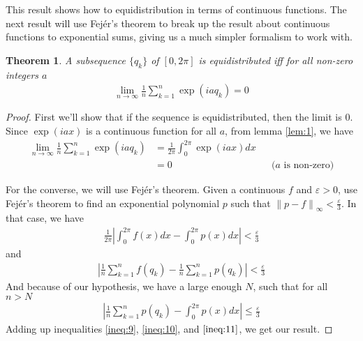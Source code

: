 \documentclass[12pt]{article}
\newtheorem{thm}{Theorem}[section]
\theoremstyle{definition}
\newcommand{\vep}{\varepsilon}
\newcommand{\norm}[1]{\left\lVert#1\right\rVert}
\begin{document}
This result shows how to equidistribution in terms of continuous functions. The next result will use Fejér's theorem to break up the result about continuous functions to exponential sums, giving us a much simpler formalism to work with.

\begin{thm}
    A subsequence $\{q_k\}$ of $[0,2\pi]$ is equidistributed iff for all non-zero integers $a$
    \begin{align*}
        \lim\limits_{n \to \infty} \frac{1}{n} \sum_{k=1}^{n} \exp(iaq_k) = 0
    \end{align*}
\end{thm}

\begin{proof}
    First we'll show that if the sequence is equidistributed, then the limit is $0$. Since $\exp(iax)$ is a continuous function for all $a$, from lemma \ref{lem:1}, we have
    \begin{align*}
        \lim\limits_{n \to \infty} \frac{1}{n} \sum_{k=1}^{n} \exp(iaq_k) &= \frac{1}{2\pi} \int_{0}^{2\pi} \exp(iax)dx \\
        &= 0 &&\text{($a$ is non-zero)}
    \end{align*}
    
    For the converse, we will use Fejér's theorem. Given a continuous $f$ and $\vep > 0$, use Fejér's theorem to find an exponential polynomial $p$ such that $\norm{p-f}_\infty < \frac{\vep}{3}$. In that case, we have
    \begin{align}
        \frac{1}{2\pi}\left| \int_{0}^{2\pi} f(x) dx - \int_{0}^{2\pi} p(x) dx \right| < \frac{\vep}{3}  \label{ineq:9}
    \end{align}
    and
    \begin{align}
        \left| \frac{1}{n} \sum_{k=1}^{n} f(q_k) - \frac{1}{n} \sum_{k=1}^{n} p(q_k) \right| < \frac{\vep}{3} \label{ineq:10}
    \end{align}
    And because of our hypothesis, we have a large enough $N$, such that for all $n > N$
    \begin{align}
        \left| \frac{1}{n} \sum_{k=1}^{n} p(q_k) -  \int_{0}^{2\pi} p(x) dx \right| \leq \frac{\vep}{3} \label{ineq:11}
    \end{align}
    Adding up inequalities \ref{ineq:9}, \ref{ineq:10}, and $\ref{ineq:11}$, we get our result. 
\end{proof}
\end{document}

